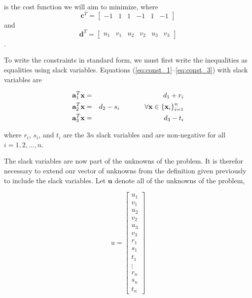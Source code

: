 \documentclass{article}
\begin{document}
\noindent is the cost function we will aim to minimize, where \[\mathbf{c}^T = \begin{bmatrix}-1 & 1 & 1 & -1 & 1 & -1\end{bmatrix}\] and \[\mathbf{d}^T = \begin{bmatrix}u_1 & v_1 & u_2 & v_2 & u_3 & v_3\end{bmatrix}\].

To write the constraints in standard form, we must first write the inequalities as equalities using slack variables.
Equations (\ref{eq:const_1}--\ref{eq:const_3}) with slack variables are

\begin{eqnarray}
\label{eq:lp_const_1} \mathbf{a}_1^T \mathbf{x} &=& d_1 + r_i\\
\label{eq:lp_const_2} \mathbf{a}_2^T \mathbf{x} &=& d_2 - s_i \hspace{0.5in} \forall{\mathbf{x}} \in \left\{ \mathbf{x}_i \right\}_{i=1}^n\\
\label{eq:lp_const_3} \mathbf{a}_3^T \mathbf{x} &=& d_3 - t_i
\end{eqnarray}

\noindent where $r_i$, $s_i$, and $t_i$ are the $3n$ slack variables and are non-negative for all $i = 1, 2, ..., n$.

The slack variables are now part of the unknowns of the problem.
It is therefor necessary to extend our vector of unknowns from the definition given previously to include the slack variables.
Let $\mathbf{u}$ denote all of the unknowns of the problem,

\begin{equation} \label{eq:u}
u = \begin{bmatrix}
u_1 \\ v_1 \\ u_2 \\ v_2 \\ u_3 \\ v_3 \\
r_1 \\ s_1 \\ t_1 \\ %
\vdots \\ r_n \\ s_n \\ t_n
\end{bmatrix}
\end{equation}
\end{document}
